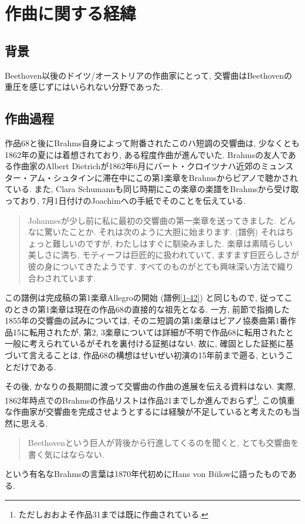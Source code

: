 
\chapter{作曲に関する経緯}

\section{背景}\label{sec: background}

Beethoven以後のドイツ/オーストリアの作曲家にとって, 交響曲はBeethovenの重圧を感じずにはいられない分野であった.




\section{作曲過程}\label{sec: process}

作品68と後にBrahms自身によって附番されたこのハ短調の交響曲は, 少なくとも1862年の夏には着想されており, ある程度作曲が進んでいた.
Brahmsの友人である作曲家のAlbert Dietrichが1862年6月にバート・クロイツナハ近郊のミュンスター・アム・シュタインに滞在中にこの第1楽章をBrahmsからピアノで聴かされている\cite{kaisouroku}.
また, Clara Schumannも同じ時期にこの楽章の楽譜をBrahmsから受け取っており, 7月1日付けのJoachimへの手紙でそのことを伝えている.
\begin{quote}
	Johannesが少し前に私に最初の交響曲の第一楽章を送ってきました. どんなに驚いたことか. それは次のように大胆に始まります.
	(譜例) %
	それはちょっと難しいのですが, わたしはすぐに馴染みました.
	楽章は素晴らしい美しさに満ち, モティーフは巨匠的に扱われていて, ますます巨匠らしさが彼の身についてきたようです.
	すべてのものがとても興味深い方法で織り合わされています.\cite{compos}
\end{quote}
この譜例は完成稿の第1楽章Allegroの開始 (譜例\ref{1-42}) と同じもので, 従ってこのときの第1楽章は現在の作品68の直接的な祖先となる.
一方, 前節で指摘した1855年の交響曲の試みについては, そのニ短調の第1楽章はピアノ協奏曲第1番作品15に転用されたが,
第2, 3楽章については詳細が不明で作品68に転用されたと一般に考えられているがそれを裏付ける証拠はない.
故に, 確固とした証拠に基づいて言えることは, 作品68の構想はせいぜい初演の15年前まで遡る, ということだけである.

その後, かなりの長期間に渡って交響曲の作曲の進展を伝える資料はない.
実際, 1862年時点でのBrahmsの作品リストは作品21までしか進んでおらず\footnote{ただしおおよそ作品31までは既に作曲されている.},
この慎重な作曲家が交響曲を完成させようとするには経験が不足していると考えたのも当然に思える.
\begin{quote}
	Beethovenという巨人が背後から行進してくるのを聞くと, とても交響曲を書く気にはならない.\cite{denki}
\end{quote}
という有名なBrahmsの言葉は1870年代初めにHans von Bülowに語ったものである\cite{library}.

